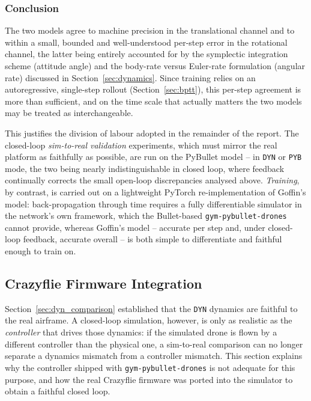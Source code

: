 \documentclass[11pt,a4paper]{article}
\theoremstyle{remark}
\numberwithin{equation}{section}
\begin{document}
\subsubsection*{Conclusion}

The two models agree to machine precision in the translational channel and to
within a small, bounded and well-understood per-step error in the rotational
channel, the latter being entirely accounted for by the symplectic integration
scheme (attitude angle) and the body-rate versus Euler-rate formulation (angular
rate) discussed in Section~\ref{sec:dynamics}. Since training relies on an
autoregressive, single-step rollout (Section~\ref{sec:bptt}), this per-step
agreement is more than sufficient, and on the time scale that actually matters
the two models may be treated as interchangeable.

This justifies the division of labour adopted in the remainder of the report. The
closed-loop \emph{sim-to-real validation} experiments, which must mirror the real
platform as faithfully as possible, are run on the PyBullet model -- in
\texttt{DYN} or \texttt{PYB} mode, the two being nearly indistinguishable in
closed loop, where feedback continually corrects the small open-loop
discrepancies analysed above. \emph{Training}, by contrast, is carried out on a
lightweight PyTorch re-implementation of Goffin's model: back-propagation through
time requires a fully differentiable simulator in the network's own framework,
which the Bullet-based \texttt{gym-pybullet-drones} cannot provide, whereas
Goffin's model -- accurate per step and, under closed-loop feedback, accurate
overall -- is both simple to differentiate and faithful enough to train on.

\subsection{Crazyflie Firmware Integration}\label{sec:firmware_integration}

Section~\ref{sec:dyn_comparison} established that the \texttt{DYN} dynamics are
faithful to the real airframe. A closed-loop simulation, however, is only as
realistic as the \emph{controller} that drives those dynamics: if the simulated
drone is flown by a different controller than the physical one, a sim-to-real
comparison can no longer separate a dynamics mismatch from a controller mismatch.
This section explains why the controller shipped with
\texttt{gym-pybullet-drones} is not adequate for this purpose, and how the real
Crazyflie firmware was ported into the simulator to obtain a faithful closed
loop.
\end{document}
